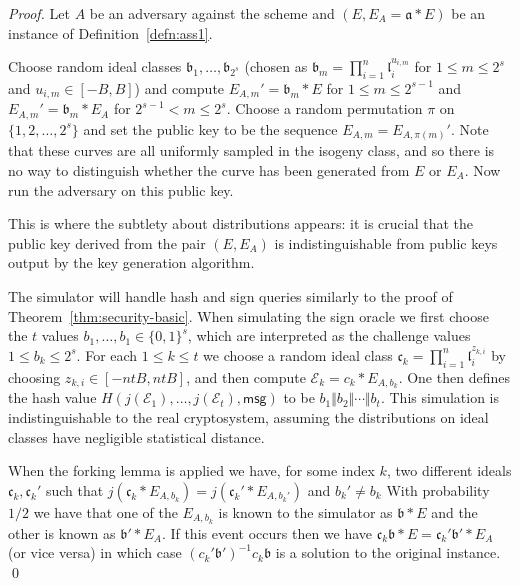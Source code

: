 \documentclass{llncs}
\newcommand{\E}{\mathcal{E}}
\newcommand{\msg}{\mathsf{msg}}
\renewcommand{\a}{\mathfrak{a}}
\renewcommand{\b}{\mathfrak{b}}
\renewcommand{\c}{\mathfrak{c}}
\renewcommand{\l}{\mathfrak{l}}
\begin{document}
\begin{proof}
Let $A$ be an adversary against the scheme and $(E, E_A = \a * E )$ be an instance of Definition~\ref{defn:ass1}.

Choose random ideal classes $\b_1, \dots, \b_{2^s}$
(chosen as $\b_m = \prod_{i=1}^n \l_i^{u_{i,m}}$ for $1 \le m \le 2^s$ and $u_{i,m} \in [-B,B]$)
and compute $E_{A,m}' = \b_m * E$ for $1 \le m \le 2^{s-1}$ and $E_{A,m}' = \b_m * E_A$ for $2^{s-1} < m \le 2^s$. Choose a random permutation $\pi$ on $\{ 1, 2, \dots, 2^s \}$ and set the public key to be the sequence $E_{A,m} = E_{A,\pi(m)}'$.
Note that these curves are all uniformly sampled in the isogeny class, and so there is no way to distinguish whether the curve has been generated from $E$ or $E_A$.
Now run the adversary on this public key.

This is where the subtlety about distributions appears: it is crucial that the public key derived from the pair $(E, E_A)$ is indistinguishable from public keys output by the key generation algorithm.


The simulator will handle hash and sign queries similarly to the proof of Theorem~\ref{thm:security-basic}.
When simulating the sign oracle we first choose the $t$ values $b_1, \dots, b_1 \in \{0,1\}^s$, which are interpreted as the challenge values $1 \le b_k \le 2^s$.
For each $1 \le k \le t$ we choose a random ideal class $\c_k = \prod_{i=1}^n \l_i^{z_{k,i}}$ by choosing $z_{k,i} \in [-ntB, ntB]$, and then compute $\E_k = c_k * E_{A,b_k}$.
One then defines the hash value $H( j(\E_1), \dots, j(\E_t), \msg )$ to be $b_1 \Vert b_2 \Vert \cdots \Vert b_t$.
This simulation is indistinguishable to the real cryptosystem, assuming the distributions on ideal classes have negligible statistical distance.

When the forking lemma is applied we have, for some index $k$, two different ideals $\c_k, \c_k'$ such that $j( \c_k * E_{A, b_k} ) = j( \c_k' * E_{A, b_k'})$ and $b_k' \ne b_k$
With probability $1/2$ we have that one of the $E_{A,b_k}$ is known to the simulator as  $\b * E$ and the other is known as $\b' * E_A$. If this event occurs then we have $\c_k \b * E = \c_k' \b' * E_A$ (or vice versa) in which case $(c_k' \b')^{-1} c_k \b$ is a solution to the original instance. \qed
\end{proof}


\end{document}
